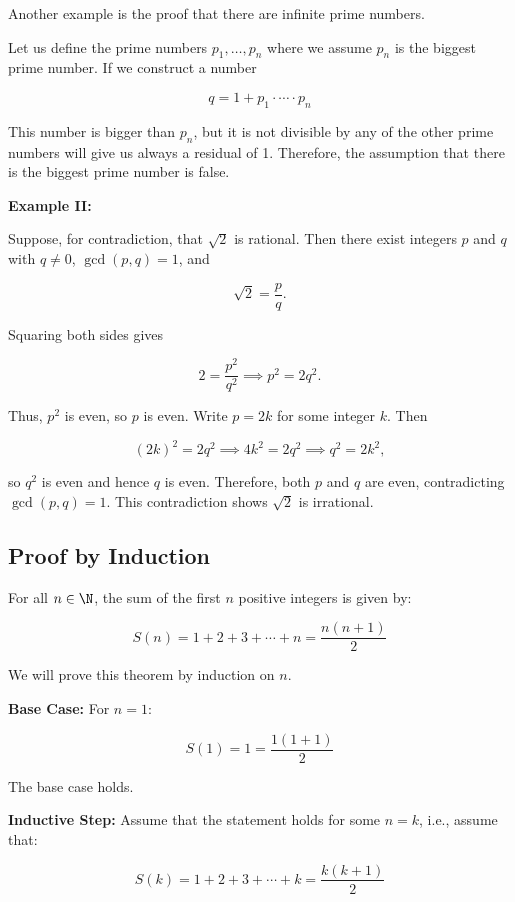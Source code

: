 Another example is the proof that there are infinite prime numbers.

Let us define the prime numbers \(p_1, \dots, p_n\) where we assume \(p_n\) is the biggest prime number. 
If we construct a number 

\[
	q = 1 + p_1 \cdot \cdots \cdot p_n 
\]

This number is bigger than \(p_n\), but it is not divisible by any of the other prime numbers will give us always a residual of 
1. Therefore, the assumption that there is the biggest prime number is false.

\QED 

\textbf{Example II:}

Suppose, for contradiction, that \(\sqrt{2}\) is rational. Then there exist integers \(p\) and \(q\) 
with \(q\neq0\), \(\gcd(p,q) = 1\), and

\[
	\sqrt{2}=\frac{p}{q}.
\]

Squaring both sides gives

\[
	2 = \frac{p^2}{q^2} \implies p^2=2q^2.
\]

Thus, \(p^2\) is even, so \(p\) is even. Write \(p=2k\) for some integer \(k\). Then

\[
	(2k)^2=2q^2 \implies 4k^2=2q^2 \implies q^2=2k^2,
\]

so \(q^2\) is even and hence \(q\) is even. Therefore, both \(p\) and \(q\) are even, contradicting 
\(\gcd(p,q)=1\). This contradiction shows \(\sqrt{2}\) is irrational.

\QED

\subsection{Proof by Induction}

For all \( n \in \N \), the sum of the first \(n\) positive integers is given by:

\[
	S(n) = 1 + 2 + 3 + \cdots + n = \frac{n(n+1)}{2}
\]

We will prove this theorem by induction on \(n\).

\textbf{Base Case:} For \( n = 1 \):

\[
	S(1) = 1 = \frac{1(1+1)}{2}
\]

The base case holds.

\textbf{Inductive Step:} Assume that the statement holds for some \( n = k \), i.e., assume that:
	
\[
	S(k) = 1 + 2 + 3 + \cdots + k = \frac{k(k+1)}{2}
\]
	
